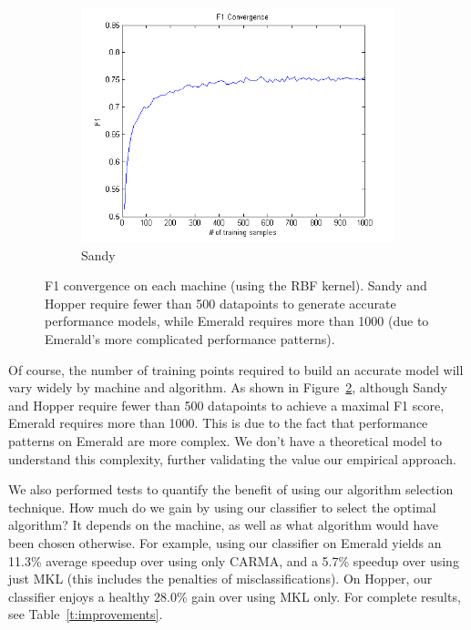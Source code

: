 \begin{figure}[t]
\begin{subfigure}[t]{0.33\textwidth}
            \includegraphics[width=\textwidth]{figures/F1_convergence_sandy.png}
            \caption{Sandy}
            \label{f:F1_sandy}
        \end{subfigure}
        \caption{F1 convergence on each machine (using the RBF kernel). Sandy and Hopper require fewer than 500 datapoints to generate accurate performance models, while Emerald requires more than 1000 (due to Emerald's more complicated performance patterns).}
    \label{fig:convergence}
\end{figure}

Of course, the number of training points required to build an accurate model will vary widely by machine and algorithm.
As shown in Figure~\ref{fig:convergence}, although Sandy and Hopper require fewer than 500 datapoints to achieve a maximal F1 score, Emerald requires more than 1000.
This is due to the fact that performance patterns on Emerald are more complex.
We don't have a theoretical model to understand this complexity, further validating the value our empirical approach.

We also performed tests to quantify the benefit of using our algorithm selection technique.
How much do we gain by using our classifier to select the optimal algorithm?
It depends on the machine, as well as what algorithm would have been chosen otherwise.
For example, using our classifier on Emerald yields an 11.3\% average speedup over using only CARMA, and a 5.7\% speedup over using just MKL (this includes the penalties of misclassifications).
On Hopper, our classifier enjoys a healthy 28.0\% gain over using MKL only.
For complete results, see Table~\ref{t:improvements}.

